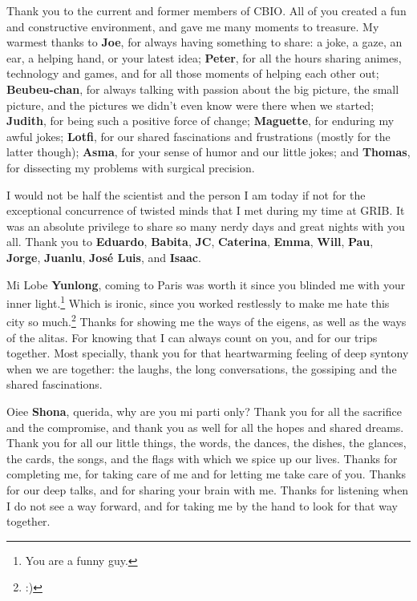 \documentclass[
  11pt,
]{env/yjiao}
\begin{document}
Thank you to the current and former members of CBIO. All of you created a fun and constructive environment, and gave me many moments to treasure. My warmest thanks to \textbf{Joe}, for always having something to share: a joke, a gaze, an ear, a helping hand, or your latest idea; \textbf{Peter}, for all the hours sharing animes, technology and games, and for all those moments of helping each other out; \textbf{Beubeu-chan}, for always talking with passion about the big picture, the small picture, and the pictures we didn't even know were there when we started; \textbf{Judith}, for being such a positive force of change; \textbf{Maguette}, for enduring my awful jokes; \textbf{Lotfi}, for our shared fascinations and frustrations (mostly for the latter though); \textbf{Asma}, for your sense of humor and our little jokes; and \textbf{Thomas}, for dissecting my problems with surgical precision.

I would not be half the scientist and the person I am today if not for the exceptional concurrence of twisted minds that I met during my time at GRIB. It was an absolute privilege to share so many nerdy days and great nights with you all. Thank you to \textbf{Eduardo}, \textbf{Babita}, \textbf{JC}, \textbf{Caterina}, \textbf{Emma}, \textbf{Will}, \textbf{Pau}, \textbf{Jorge}, \textbf{Juanlu}, \textbf{José Luis}, and \textbf{Isaac}.

Mi Lobe \textbf{Yunlong}, coming to Paris was worth it since you blinded me with your inner light.\footnote{You are a funny guy.} Which is ironic, since you worked restlessly to make me hate this city so much.\footnote{:)} Thanks for showing me the ways of the eigens, as well as the ways of the alitas. For knowing that I can always count on you, and for our trips together. Most specially, thank you for that heartwarming feeling of deep syntony when we are together: the laughs, the long conversations, the gossiping and the shared fascinations.

Oiee \textbf{Shona}, querida, why are you mi parti only? Thank you for all the sacrifice and the compromise, and thank you as well for all the hopes and shared dreams. Thank you for all our little things, the words, the dances, the dishes, the glances, the cards, the songs, and the flags with which we spice up our lives. Thanks for completing me, for taking care of me and for letting me take care of you. Thanks for our deep talks, and for sharing your brain with me. Thanks for listening when I do not see a way forward, and for taking me by the hand to look for that way together.
\end{document}
